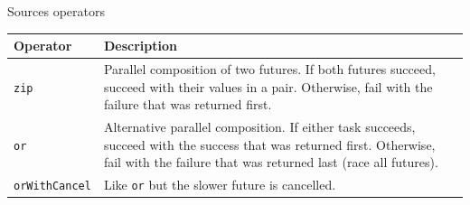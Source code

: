 \documentclass[aspectratio=1610,xcolor=dvipsnames]{beamer}
\begin{document}
%
\begin{frame}{Sources operators}
  \small
  \begin{table}
    \centering
    \renewcommand{\arraystretch}{1.5}
    \begin{tabular}{ | m{4cm} | m{9cm} | } 
      \hline
      \textbf{Operator} & \textbf{Description} \\
      \hline
      \hline
      \texttt{zip} & Parallel composition of two futures. If both futures succeed, succeed with their values in a pair. Otherwise, fail with the failure that was returned first. \\ 
      \hline
      \texttt{or} & Alternative parallel composition. If either task succeeds, succeed with the success that was returned first. Otherwise, fail with the failure that was returned last (race all futures). \\
      \hline
      \texttt{orWithCancel} & Like \texttt{or} but the slower future is cancelled. \\ 
      \hline
    \end{tabular}
  \end{table}
\end{frame}
%
\end{document}
